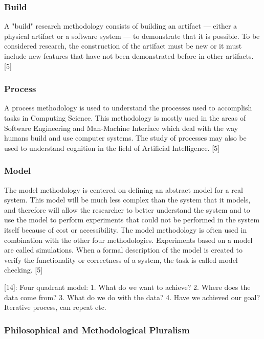\subsubsection{Build}

A "build" research methodology consists of building an artifact — either a physical artifact or a software system — to demonstrate that it is possible. To be considered research, the construction of the artifact must be new or it must include new features that have not been demonstrated before in other artifacts. [5]

\subsubsection{Process}

A process methodology is used to understand the processes used to accomplish tasks in Computing Science. This methodology is mostly used in the areas of Software Engineering and Man-Machine Interface which deal with the way humans build and use computer systems. The study of processes may also be used to understand cognition in the field of Artificial Intelligence. [5]

\subsubsection{Model}

The model methodology is centered on defining an abstract model for a real system. This model will be much less complex than the system that it models, and therefore will allow the researcher to better understand the system and to use the model to perform experiments that could not be performed in the system itself because of cost or accessibility. The model methodology is often used in combination with the other four methodologies. Experiments based on a model are called simulations. When a formal description of the model is created to verify the functionality or correctness of a system, the task is called model checking. [5]

[14]:
Four quadrant model:
1.	What do we want to achieve?
2.	Where does the data come from?
3.	What do we do with the data?
4.	Have we achieved our goal?
Iterative process, can repeat etc.

\subsubsection{Philosophical and Methodological Pluralism}

